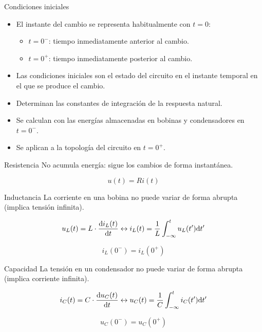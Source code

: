 \documentclass[aspectratio=169, usenames,svgnames,dvipsnames]{beamer}
\begin{document}
\begin{frame}[label={sec:orgfa38687}]{Condiciones iniciales}
\begin{itemize}
\item El instante del cambio se representa habitualmente con \(t = 0\):
\begin{itemize}
\item \(t = 0^-\): tiempo inmediatamente anterior al cambio.
\item \(t = 0^+\): tiempo inmediatamente posterior al cambio.
\end{itemize}

\item Las \alert{condiciones iniciales} son el estado del circuito en el instante temporal en el que se produce el cambio.

\item Determinan las \alert{constantes de integración} de la respuesta natural.

\item \alert{Se calculan} con las energías almacenadas en bobinas y condensadores en \(t = 0^-\).

\item \alert{Se aplican} a la topología del circuito en \(t = 0^+\).
\end{itemize}
\end{frame}

\begin{frame}[label={sec:org2933e8a}]{Resistencia}
No acumula energía: sigue los cambios de forma instantánea.

\[
u(t) = R i(t)
\]
\end{frame}



\begin{frame}[label={sec:org88790ce}]{Inductancia}
La corriente en una bobina no puede variar de forma abrupta (implica tensión infinita).

\[
u_L(t) = L \cdot \diff{i_L(t)}{t}
\leftrightarrow
i_L(t) = \frac{1}{L} \int^t_{-\infty}u_L(t') \mathrm{d}t'
\]

\[
\boxed{i_L(0^-) = i_L(0^+)}
\]
\end{frame}

\begin{frame}[label={sec:org4e6e103}]{Capacidad}
La tensión en un condensador no puede variar de forma abrupta (implica corriente infinita).

\[
i_C(t) = C \cdot \diff{u_C(t)}{t}
\leftrightarrow
u_C(t) = \frac{1}{C} \int^t_{-\infty}i_C(t') \mathrm{d}t'
\]

\[
\boxed{u_C(0^-) = u_C(0^+)}
\]
\end{frame}
\end{document}
